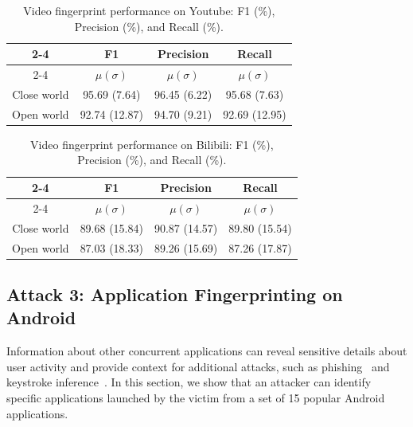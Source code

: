 \begin{table}[]
\centering
\caption{Video fingerprint performance on Youtube: F1 (\%), Precision (\%), and Recall (\%).}
\begin{tabular}{c|c|c|c|}
\cline{2-4}
                                  & \textbf{F1}     & \textbf{Precision} & \textbf{Recall} \\ \cline{2-4} 
                                  & \textbf{$ \mu (\sigma)$} & \textbf{$ \mu (\sigma)$}    & \textbf{$ \mu (\sigma)$} \\ \hline \hline
\multicolumn{1}{|c|}{Close world} &   95.69 (7.64)  &   96.45 (6.22)    &  95.68 (7.63) \\ \hline
\multicolumn{1}{|c|}{Open world}  &   92.74 (12.87)              &       94.70  (9.21)             &   92.69 (12.95)              \\ \hline
\end{tabular}
\label{tb:youtube_results}
\end{table}


\begin{table}[]
\centering
\caption{Video fingerprint performance on Bilibili: F1 (\%), Precision (\%), and Recall (\%).}
\begin{tabular}{c|c|c|c|}
\cline{2-4}
                                  & \textbf{F1}     & \textbf{Precision} & \textbf{Recall} \\ \cline{2-4} 
                                  & \textbf{$ \mu (\sigma)$} & \textbf{$ \mu (\sigma)$}    & \textbf{$ \mu (\sigma)$} \\ \hline \hline
\multicolumn{1}{|c|}{Close world} &  89.68 (15.84)  &   90.87 (14.57)     &   89.80 (15.54)  \\ \hline
\multicolumn{1}{|c|}{Open world}  &    87.03 (18.33)             &     89.26 (15.69)               &     87.26 (17.87)            \\ \hline
\end{tabular}
\label{tb:bili_results}
\end{table}


\subsection{Attack 3: Application Fingerprinting on Android}
\label{subsec:app_finger}

Information about other concurrent applications can reveal sensitive details about user activity and provide context for additional attacks, such as phishing~\cite{diao2016no} and keystroke inference~\cite{zhang2023s}. In this section, we show that an attacker can identify specific applications launched by the victim from a set of 15 popular Android applications.

